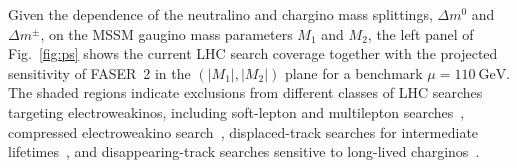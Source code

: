 \documentclass[
    prl,
    twocolumn,
    superscriptaddress,
    nofootinbib,
    amsmath, amssymb,
    aps,
    reprint,
    floatfix
]{revtex4-2}
\newcommand{\Shufang}[1]{\textcolor{red} {SS: #1}}
\begin{document}

Given the dependence of the neutralino and chargino mass splittings, $\Delta m^0$ and $\Delta m^\pm$, on the MSSM gaugino mass parameters $M_1$ and $M_2$, the left panel of Fig.~\ref{fig:ps} shows the current LHC search coverage together with the projected sensitivity of FASER~2 in the $(|M_1|,|M_2|)$ plane for a benchmark $\mu = 110~\mathrm{GeV}$. 
The shaded regions indicate exclusions from different classes of LHC searches targeting electroweakinos, including soft-lepton and multilepton searches~\cite{ATLAS:2021moa, ATLAS:2019lng, CMS:2021edw}, compressed electroweakino search~\cite{CMS-PAS-EXO-23-017}, displaced-track searches for intermediate lifetimes~\cite{ATLAS:2024umc, CMS:2025twk}, and disappearing-track searches sensitive to long-lived charginos~\cite{ATLAS:2022rme, CMS:2023mny}.
\end{document}
